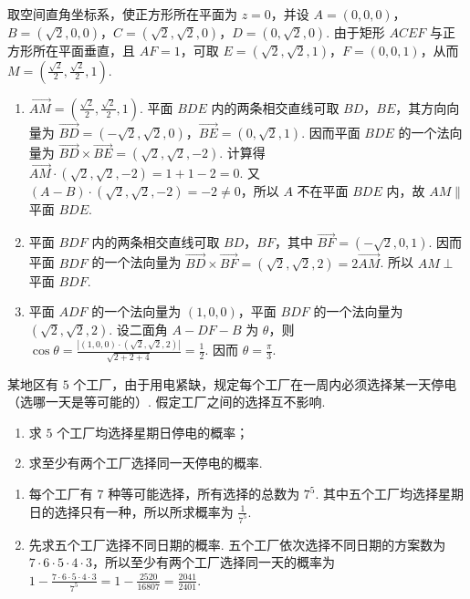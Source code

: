 \begin{solution}
取空间直角坐标系，使正方形所在平面为 \(z=0\)，并设
\(A=(0,0,0)\)，\(B=(\sqrt{2},0,0)\)，\(C=(\sqrt{2},\sqrt{2},0)\)，\(D=(0,\sqrt{2},0)\). 由于矩形 \(ACEF\) 与正方形所在平面垂直，且 \(AF=1\)，可取
\(E=(\sqrt{2},\sqrt{2},1)\)，\(F=(0,0,1)\)，从而 \(M=\left(\frac{\sqrt{2}}{2},\frac{\sqrt{2}}{2},1\right)\).

\begin{enumerate}
\item \(\overrightarrow{AM}=\left(\frac{\sqrt{2}}{2},\frac{\sqrt{2}}{2},1\right)\). 平面 \(BDE\) 内的两条相交直线可取 \(BD\)，\(BE\)，其方向向量为
\(\overrightarrow{BD}=(-\sqrt{2},\sqrt{2},0)\)，\(\overrightarrow{BE}=(0,\sqrt{2},1)\). 因而平面 \(BDE\) 的一个法向量为
\(\overrightarrow{BD}\times\overrightarrow{BE}=(\sqrt{2},\sqrt{2},-2)\). 计算得
\(\overrightarrow{AM}\cdot(\sqrt{2},\sqrt{2},-2)=1+1-2=0\). 又
\((A-B)\cdot(\sqrt{2},\sqrt{2},-2)=-2\neq0\)，所以 \(A\) 不在平面 \(BDE\) 内，故 \(AM\parallel\) 平面 \(BDE\).
\item 平面 \(BDF\) 内的两条相交直线可取 \(BD\)，\(BF\)，其中 \(\overrightarrow{BF}=(-\sqrt{2},0,1)\). 因而平面 \(BDF\) 的一个法向量为
\(\overrightarrow{BD}\times\overrightarrow{BF}=(\sqrt{2},\sqrt{2},2)=2\overrightarrow{AM}\). 所以 \(AM\perp\) 平面 \(BDF\).
\item 平面 \(ADF\) 的一个法向量为 \((1,0,0)\)，平面 \(BDF\) 的一个法向量为 \((\sqrt{2},\sqrt{2},2)\). 设二面角 \(A-DF-B\) 为 \(\theta\)，则
\(\cos\theta=\frac{|(1,0,0)\cdot(\sqrt{2},\sqrt{2},2)|}{\sqrt{2+2+4}}=\frac{1}{2}\). 因而 \(\theta=\frac{\pi}{3}\).
\end{enumerate}
\end{solution}

\begin{problem}
某地区有 \(5\) 个工厂，由于用电紧缺，规定每个工厂在一周内必须选择某一天停电（选哪一天是等可能的）. 假定工厂之间的选择互不影响.

\begin{enumerate}
\item 求 \(5\) 个工厂均选择星期日停电的概率；
\item 求至少有两个工厂选择同一天停电的概率.
\end{enumerate}
\end{problem}

\begin{solution}
\begin{enumerate}
\item 每个工厂有 \(7\) 种等可能选择，所有选择的总数为 \(7^5\). 其中五个工厂均选择星期日的选择只有一种，所以所求概率为 \(\frac{1}{7^5}\).
\item 先求五个工厂选择不同日期的概率. 五个工厂依次选择不同日期的方案数为 \(7\cdot6\cdot5\cdot4\cdot3\)，所以至少有两个工厂选择同一天的概率为
\(1-\frac{7\cdot6\cdot5\cdot4\cdot3}{7^5}=1-\frac{2520}{16807}=\frac{2041}{2401}\).
\end{enumerate}
\end{solution}

